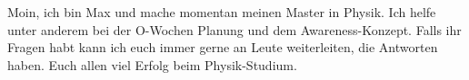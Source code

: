 \begin{multicols}{2}
{
Moin, ich bin Max und mache momentan meinen Master in Physik. Ich helfe unter anderem bei der O-Wochen Planung und dem Awareness-Konzept. Falls ihr Fragen habt kann ich euch immer gerne an Leute weiterleiten, die Antworten haben. Euch allen viel Erfolg beim Physik-Studium. 
}





%
%
%
%




\end{multicols}

